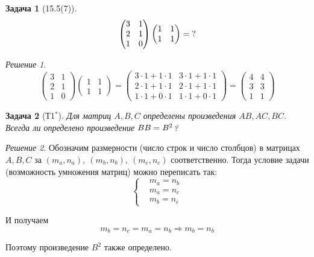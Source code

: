 \documentclass[a4paper,12pt]{article}
\newtheorem*{problem}{Задача}
\theoremstyle{definition}
\theoremstyle{remark}
\theoremstyle{remark}
\theoremstyle{remark}
\newtheorem*{solution}{Решение}
\begin{document}
  \begin{problem}[15.5(7)]
    \[
      \begin{pmatrix}
        3 & 1\\
        2 & 1\\
        1 & 0
      \end{pmatrix}
      \begin{pmatrix}
        1 & 1\\
        1 & 1
      \end{pmatrix}= \operatorname{?}
    \]
  \end{problem}
  
  \begin{solution}
    \[
      \begin{pmatrix}
        3 & 1\\
        2 & 1\\
        1 & 0
      \end{pmatrix}
      \begin{pmatrix}
        1 & 1\\
        1 & 1
      \end{pmatrix}
      = \begin{pmatrix}
        3 \cdot 1 + 1 \cdot 1 & 3 \cdot 1 + 1 \cdot 1\\
        2 \cdot 1 + 1 \cdot 1 & 2 \cdot 1 + 1 \cdot 1\\
        1 \cdot 1 + 0 \cdot 1 & 1 \cdot 1 + 0 \cdot 1
      \end{pmatrix}
      = \begin{pmatrix}
        4 & 4\\
        3 & 3\\
        1 & 1
      \end{pmatrix}
    \]
  \end{solution}
  
  \begin{problem}[Т1$^*$]
    Для матриц $A, B, C$ определены произведения $AB, AC, BC$.
    Всегда ли определено произведение $BB \hm= B^2$?
  \end{problem}
  
  \begin{solution}
    Обозначим размерности (число строк и число столбцов) в матрицах $A, B, C$ за
    $(m_a, n_a),\ (m_b, n_b),\ (m_c, n_c)$ соответственно.
    Тогда условие задачи (возможность умножения матриц) можно переписать так:
    \[
      \left\{
        \begin{aligned}
          &m_a = n_b\\
          &m_a = n_c\\
          &m_b = n_c
        \end{aligned}
      \right.
    \]
    
    И получаем
    \[
      m_b = n_c = m_a = n_b \Rightarrow m_b = n_b
    \]
    
    Поэтому произведение $B^2$ также определено.
  \end{solution}
  
\end{document}
